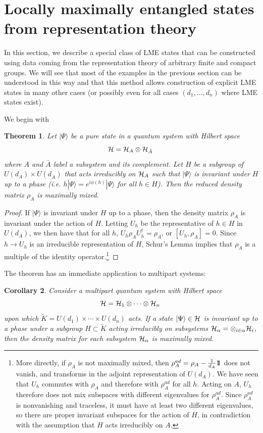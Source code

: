 \documentclass[12pt]{article}
\newtheorem{theorem}{Theorem}[section]
\newtheorem{corollary}[theorem]{Corollary}
\theoremstyle{definition}
\def\identity{{\rlap{1} \hskip 1.6pt \hbox{1}}}
\begin{document}
\section{Locally maximally entangled states from representation theory}

In this section, we describe a special class of LME states that can be constructed using data coming from the representation theory of arbitrary finite and compact groups. We will see that most of the examples in the previous section can be understood in this way and that this method allows construction of explicit LME states in many other cases (or possibly even for all cases $(d_1, \dots, d_n)$ where LME states exist).

We begin with
\begin{theorem}
Let $|\Psi \rangle$ be a pure state in a quantum system with Hilbert space
\[
{\cal H} = {\cal H}_A \otimes {\cal H}_{\bar{A}} \;
\]
where $A$ and $\bar{A}$ label a subsystem and its complement. Let $H$ be a subgroup of $U(d_A) \times U(d_{\bar{A}})$ that acts irreducibly on ${\cal H}_A$ such that $|\Psi \rangle$ is invariant under $H$ up to a phase (i.e. $h|\Psi \rangle = e^{i \phi(h)}|\Psi \rangle$ for all $h \in H$). Then the reduced density matrix $\rho_A$ is maximally mixed.
\end{theorem}
\begin{proof}
If $|\Psi \rangle$ is invariant under $H$ up to a phase, then the density matrix $\rho_A$ is invariant under the action of $H$. Letting $U_h$ be the representative of $h \in H$ in $U(d_A)$, we then have that for all $h$, $U_h \rho_A U_h^\dagger = \rho_A$, or $[U_h, \rho_A] = 0$. Since $h \to U_h$ is an irreducible representation of $H$, Schur's Lemma implies that $\rho_A$ is a multiple of the identity operator.\footnote{More directly, if $\rho_A$ is not maximally mixed, then $\rho_A^{ad} = \rho_A - {1 \over d_A} \identity$ does not vanish, and transforms in the adjoint representation of $U(d_A)$. We have seen that $U_h$ commutes with $\rho_A$ and therefore with $\rho^{ad}_A$ for all $h$. Acting on $A$, $U_h$ therefore does not mix subspaces with different eigenvalues for $\rho^{ad}_A$. Since $\rho^{ad}_A$ is nonvanishing and traceless, it must have at least two different eigenvalues, so there are proper invariant subspaces for the action of $H$, in contradiction with the assumption that $H$ acts irreducibly on $A$.}
\end{proof}
The theorem has an immediate application to multipart systems:
\begin{corollary}
Consider a multipart quantum system with Hilbert space
\[
{\cal H} = {\cal H}_1 \otimes \cdots \otimes {\cal H}_n \;
\]
upon which $\tilde{K} = U(d_1) \times \cdots \times U(d_n)$ acts. If a state $|\Psi \rangle \in {\cal H}$ is invariant up to a phase under a subgroup $H \subset \tilde{K}$ acting irreducibly on subsystems ${\cal H}_{\alpha} = \otimes_{i \in \alpha} {\cal H}_i$, then the density matrix for each subsystem ${\cal H}_{\alpha}$ is maximally mixed.
\end{corollary}
\end{document}
